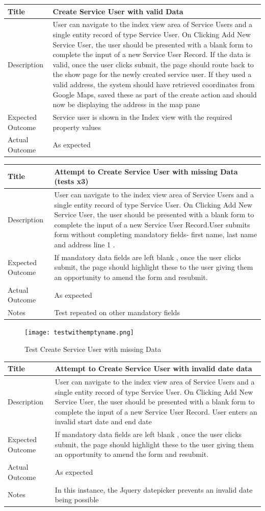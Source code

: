 \documentclass[a4paper,12pt]{article}
\newcommand\addrow[2]{#1 &#2\\ }
\newcommand\addheading[2]{#1 &#2\\ \hline}
\newcommand\tabularhead{\begin{tabular}{lp{11cm}}
\hline
}
\newenvironment{usecase}{\tabularhead}
{\hline\end{tabular}}
\begin{document}
\begin{usecase}
    \addheading{Title}{Create Service User with valid Data}
  \addheading{Description}{User can navigate to the index view area of Service Users and a single entity record of type Service User. On Clicking Add New Service User, the user should be presented with a blank form to complete the input of a new Service User Record. If the data is valid, once the user clicks submit, the page should route back to the show page for the newly created service user. If they used a valid address, the system should have retrieved coordinates from Google Maps, saved these as part of the create action and should now be displaying the address in the map pane}
  \addrow{Expected Outcome}{Service user is shown in the Index view with the required property values}
  \addrow{Actual Outcome}{As expected}
\end{usecase}

\begin{usecase}
    \addheading{Title}{Attempt to Create Service User with missing Data (tests x3)}
  \addheading{Description}{User can navigate to the index view area of Service Users and a single entity record of type Service User. On Clicking Add New Service User, the user should be presented with a blank form to complete the input of a new Service User Record.User submits form without completing mandatory fields- first name, last name and address line 1 .}
  \addrow{Expected Outcome}{If mandatory data fields are left blank , once the user clicks submit, the page should highlight these to the user giving them an opportunity to amend the form and resubmit.}
  \addrow{Actual Outcome}{As expected}
  \addrow{Notes}{Test repeated on other mandatory fields}
\end{usecase}

 \begin{figure}[h!]
\texttt{[image: testwithemptyname.png]}
  \caption{Test Create Service User with missing Data}
  \label{fig:Test Create Service User with missing Data}
\end{figure}

\begin{usecase}
    \addheading{Title}{Attempt to Create Service User with invalid date data}
  \addheading{Description}{User can navigate to the index view area of Service Users and a single entity record of type Service User. On Clicking Add New Service User, the user should be presented with a blank form to complete the input of a new Service User Record. User enters an invalid start date and end date}
  \addrow{Expected Outcome}{If mandatory data fields are left blank , once the user clicks submit, the page should highlight these to the user giving them an opportunity to amend the form and resubmit.}
  \addrow{Actual Outcome}{As expected}
  \addrow{Notes}{In this instance, the Jquery datepicker prevents an invalid date being possible}
\end{usecase}
\end{document}

